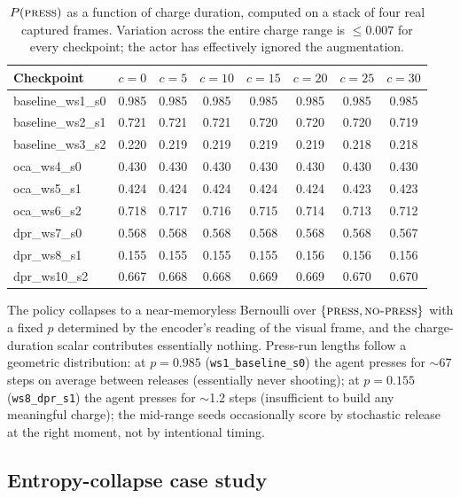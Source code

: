 \documentclass{article}
\begin{document}
\begin{table}[h]
  \caption{$P(\textsc{press})$ as a function of charge duration,
  computed on a stack of four real captured frames. Variation
  across the entire charge range is $\leq 0.007$ for every
  checkpoint; the actor has effectively ignored the augmentation.}
  \label{tab:charge_ignored}
  \centering
  \small
  \begin{tabular}{lccccccc}
    \toprule
    \textbf{Checkpoint} & $c{=}0$ & $c{=}5$ & $c{=}10$ & $c{=}15$ & $c{=}20$ & $c{=}25$ & $c{=}30$ \\
    \midrule
    baseline\_ws1\_s0  & 0.985 & 0.985 & 0.985 & 0.985 & 0.985 & 0.985 & 0.985 \\
    baseline\_ws2\_s1  & 0.721 & 0.721 & 0.721 & 0.720 & 0.720 & 0.720 & 0.719 \\
    baseline\_ws3\_s2  & 0.220 & 0.219 & 0.219 & 0.219 & 0.219 & 0.218 & 0.218 \\
    oca\_ws4\_s0       & 0.430 & 0.430 & 0.430 & 0.430 & 0.430 & 0.430 & 0.430 \\
    oca\_ws5\_s1       & 0.424 & 0.424 & 0.424 & 0.424 & 0.424 & 0.423 & 0.423 \\
    oca\_ws6\_s2       & 0.718 & 0.717 & 0.716 & 0.715 & 0.714 & 0.713 & 0.712 \\
    dpr\_ws7\_s0       & 0.568 & 0.568 & 0.568 & 0.568 & 0.568 & 0.568 & 0.567 \\
    dpr\_ws8\_s1       & 0.155 & 0.155 & 0.155 & 0.155 & 0.156 & 0.156 & 0.156 \\
    dpr\_ws10\_s2      & 0.667 & 0.668 & 0.668 & 0.669 & 0.669 & 0.670 & 0.670 \\
    \bottomrule
  \end{tabular}
\end{table}

The policy collapses to a near-memoryless Bernoulli over
$\{\textsc{press}, \textsc{no-press}\}$ with a fixed $p$
determined by the encoder's reading of the visual frame, and the
charge-duration scalar contributes essentially nothing. Press-run
lengths follow a geometric distribution: at $p=0.985$
(\texttt{ws1\_baseline\_s0}) the agent presses for
$\sim$67 steps on average between releases (essentially never
shooting); at $p=0.155$ (\texttt{ws8\_dpr\_s1}) the agent presses
for $\sim$1.2 steps (insufficient to build any meaningful charge);
the mid-range seeds occasionally score by stochastic release at
the right moment, not by intentional timing.

\subsection{Entropy-collapse case study}
\label{sec:rnd-finding}
\end{document}
